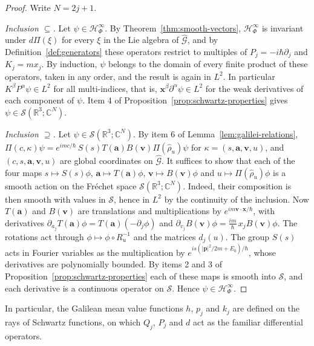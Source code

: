 \begin{proof}
	Write $N=2j+1$.
	
	\emph{Inclusion $\subseteq$.} Let $\psi\in\mathcal{H}^\infty_\Phi$. By Theorem~\ref{thm:smooth-vectors}, $\mathcal{H}^\infty_\Phi$ is invariant under $d\Pi(\xi)$ for every $\xi$ in the Lie algebra of $\widehat{\mathcal{G}}$, and by Definition~\ref{def:generators} these operators restrict to multiples of $P_j=-i\hbar\partial_j$ and $K_j=mx_j$. By induction, $\psi$ belongs to the domain of every finite product of these operators, taken in any order, and the result is again in $L^2$. In particular $K^\beta P^\alpha\psi\in L^2$ for all multi-indices, that is, $\mathbf{x}^\beta\partial^\alpha\psi\in L^2$ for the weak derivatives of each component of $\psi$. Item 4 of Proposition~\ref{prop:schwartz-properties} gives $\psi\in\mathcal{S}(\mathbb{R}^3;\mathbb{C}^N)$.
	
	\emph{Inclusion $\supseteq$.} Let $\psi\in\mathcal{S}(\mathbb{R}^3;\mathbb{C}^N)$. By item 6 of Lemma~\ref{lem:galilei-relations}, $\Pi(c,\kappa)\psi=e^{imc/\hbar}\,S(s)T(\mathbf{a})B(\mathbf{v})\Pi(\hat\rho_u)\psi$ for $\kappa=(s,\mathbf{a},\mathbf{v},u)$, and $(c,s,\mathbf{a},\mathbf{v},u)$ are global coordinates on $\widehat{\mathcal{G}}$. It suffices to show that each of the four maps $s\mapsto S(s)\phi$, $\mathbf{a}\mapsto T(\mathbf{a})\phi$, $\mathbf{v}\mapsto B(\mathbf{v})\phi$ and $u\mapsto\Pi(\hat\rho_u)\phi$ is a smooth action on the Fr\'echet space $\mathcal{S}(\mathbb{R}^3;\mathbb{C}^N)$. Indeed, their composition is then smooth with values in $\mathcal{S}$, hence in $L^2$ by the continuity of the inclusion. Now $T(\mathbf{a})$ and $B(\mathbf{v})$ are translations and multiplications by $e^{im\mathbf{v}\cdot\mathbf{x}/\hbar}$, with derivatives $\partial_{a_j}T(\mathbf{a})\phi=T(\mathbf{a})(-\partial_j\phi)$ and $\partial_{v_j}B(\mathbf{v})\phi=\tfrac{im}{\hbar}\,x_jB(\mathbf{v})\phi$. The rotations act through $\phi\mapsto\phi\circ R_u^{-1}$ and the matrices $d_j(u)$. The group $S(s)$ acts in Fourier variables as the multiplication by $e^{is(|\mathbf{p}|^2/2m+E_0)/\hbar}$, whose derivatives are polynomially bounded. By items 2 and 3 of Proposition~\ref{prop:schwartz-properties} each of these maps is smooth into $\mathcal{S}$, and each derivative is a continuous operator on $\mathcal{S}$. Hence $\psi\in\mathcal{H}^\infty_\Phi$.
\end{proof}

\noindent In particular, the Galilean mean value functions $h$, $p_j$ and $k_j$ are defined on the rays of Schwartz functions, on which $Q_j$, $P_j$ and $d$ act as the familiar differential operators.

